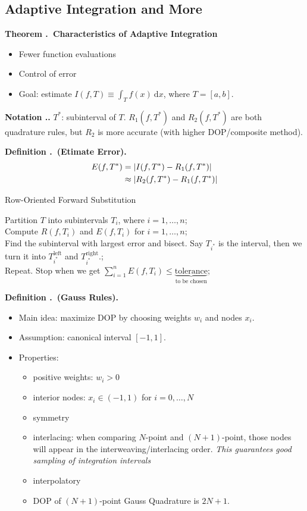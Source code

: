 \documentclass[12pt, a4paper]{article}
\newcounter{index}[subsection]
\newenvironment*{df}[1]{\par\noindent\textbf{Definition \thesubsection.\stepcounter{index}\theindex\ (#1).}}{\par}
\newenvironment*{thm}[1]{\begin{tcolorbox}\par\noindent\textbf{Theorem \thesubsection.\stepcounter{index}\theindex\ #1} \par}{\par\end{tcolorbox}}
\newenvironment*{nota}{\par\noindent\textbf{Notation \thesubsection.\stepcounter{index}\theindex.}}{\par}
\def\d{{\mathrm{d}}}
\def\dsst{\displaystyle}
\def\DOP{\mathrm{DOP}}
\begin{document}
\subsection{Adaptive Integration and More}
\begin{thm}{Characteristics of Adaptive Integration}
	\begin{itemize}
		\item Fewer function evaluations
		\item Control of error
		\item Goal: estimate $\dsst I(f,T)\equiv\int_Tf(x)\ \d{x}$, where $T=[a,b]$.
	\end{itemize}	
\end{thm}
\begin{nota}
	$T^*$: subinterval of $T$. $R_1(f,T^*)$ and $R_2(f,T^*)$ are both quadrature rules, but $R_2$ is more accurate (with higher $\DOP$/composite method). 
\end{nota}
\begin{df}{Etimate Error}
	\begin{align*}E(f,T^*)&=\qty|I(f,T^*)-R_1(f,T^*)|\\&\approx\qty|R_2(f,T^*)-R_1(f,T^*)|\end{align*}
\end{df}
\begin{algorithm}\caption{Row-Oriented Forward Substitution}
	Partition $T$ into subintervals $T_i$, where $i=1,\dots,n$;\\
	Compute	$R(f,T_i)$ and $E(f,T_i)$ for $i=1,\dots,n$;\\
	Find the subinterval with largest error and bisect. Say $T_{i^*}$ is the interval, then we turn it into $T_{i^*}^\text{left}$ and $T_{i^*}^\text{right}$.;\\
	Repeat. Stop when we get $\dsst\sum_{i=1}^nE(f,T_i)\leq\underbrace{\text{tolerance}}_\text{to be chosen}$;
\end{algorithm}
\begin{df}{Gauss Rules}
	\begin{itemize}
		\item Main idea: maximize $\DOP$ by choosing weights $w_i$ and nodes $x_i$.
		\item Assumption: canonical interval $[-1,1]$.
		\item Properties:
		\begin{itemize}
			\item positive weights: $w_i>0$
			\item interior nodes: $x_i\in(-1,1)$ for $i=0,\dots,N$
			\item symmetry
			\item interlacing: when comparing $N$-point and $(N+1)$-point, those nodes will appear in the interweaving/interlacing order. \textit{This guarantees good sampling of integration intervals}
			\item interpolatory
			\item $\DOP$ of $(N+1)$-point Gauss Quadrature is $2N+1$.
		\end{itemize}
	\end{itemize}
\end{df}
\end{document}
